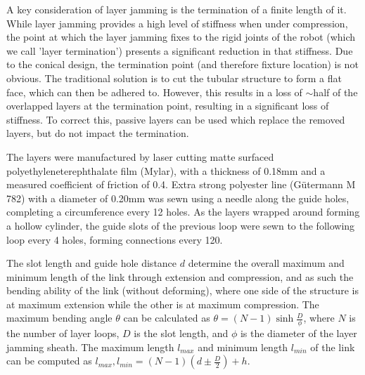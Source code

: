 A key consideration of layer jamming is the termination of a finite length of it. While layer jamming provides a high level of stiffness when under compression, the point at which the layer jamming fixes to the rigid joints of the robot (which we call 'layer termination') presents a significant reduction in that stiffness. Due to the conical design, the termination point (and therefore fixture location) is not obvious. The traditional solution is to cut the tubular structure to form a flat face, which can then be adhered to. However, this results in a loss of $\sim$half of the overlapped layers at the termination point, resulting in a significant loss of stiffness. To correct this, passive layers can be used which replace the removed layers, but do not impact the termination.

The layers were manufactured by laser cutting matte surfaced polyethyleneterephthalate film (Mylar\textsuperscript{\textregistered}), with a thickness of 0.18mm and a measured coefficient of friction of 0.4. Extra strong polyester line (G\"utermann M 782) with a diameter of 0.20mm was sewn using a needle along the guide holes, completing a circumference every 12 holes. As the layers wrapped around forming a hollow cylinder, the guide slots of the previous loop were sewn to the following loop every 4 holes, forming connections every 120\textdegree. 

The slot length and guide hole distance $d$ determine the overall maximum and minimum length of the link through extension and compression, and as such the bending ability of the link (without deforming), where one side of the structure is at maximum extension while the other is at maximum compression. The maximum bending angle $\theta$ can be calculated as $\theta = (N-1)\sinh{\frac{D}{\phi}}$,
%
 where $N$ is the number of layer loops, $D$ is the slot length, and $\phi$ is the diameter of the layer jamming sheath. The maximum length $l_{max}$ and minimum length $l_{min}$ of the link can be computed as $l_{max},l_{min} = (N-1)(d\pm\frac{D}{2})+h$.
%
%

